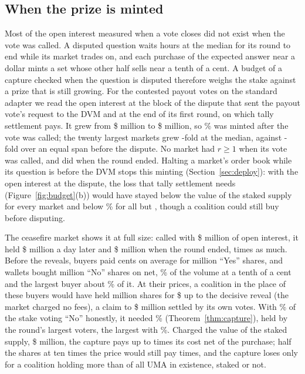 \documentclass[conference,compsoc]{IEEEtran}
\begin{document}
\subsection{When the prize is minted}
\label{sec:prize}
 Most of the open interest measured when a vote closes did not exist when the vote was called. A disputed question waits \prizeVoteHours{} hours at the median for its round to end while its market trades on, and each purchase of the expected answer near a dollar mints a set whose other half sells near a tenth of a cent. A budget of a capture checked when the question is disputed therefore weighs the stake against a prize that is still growing. For the \prizeN{} contested payout votes on the standard adapter we read the open interest at the block of the dispute that sent the payout vote's request to the DVM and at the end of its first round, on which tally settlement pays. It grew from \$\prizeEscM{} million to \$\prizeFirstM{} million, so \prizeAfterPct\% was minted after the vote was called; the twenty largest markets grew \prizeVoteGrowth-fold at the median, against \prizePreGrowth-fold over an equal span before the dispute. No market had $r \ge 1$ when its vote was called, and \prizeDeltaOneFirst{} did when the round ended. Halting a market's order book while its question is before the DVM stops this minting (Section~\ref{sec:deploy}): with the open interest at the dispute, the loss that tally settlement needs (Figure~\ref{fig:budget}(b)) would have stayed below the value of the staked supply for every market and below \deltaDetectablePct\% for all but \prizeReqDetEsc, though a coalition could still buy before disputing.

 The ceasefire market shows it at full size: called with \$\cfOIEscM{} million of open interest, it held \$\cfOIDayM{} million a day later and \$\cfOIEndM{} million when the round ended, \cfGrowth{} times as much. Before the reveals, buyers paid \cfYesCents{} cents on average for \cfYesM{} million ``Yes'' shares, and \cfBuyers{} wallets bought \cfNoM{} million ``No'' shares on net, \cfTickPct\% of the volume at a tenth of a cent and the largest buyer about \cfLargestBuyerPct\% of it. At their prices, a coalition in the place of these buyers would have held \cfNoTotalM{} million shares for \$\cfCostTotal{} up to the decisive reveal (the market charged no fees), a claim to \$\cfNoTotalM{} million settled by its own votes. With \cfHNoPct\% of the stake voting ``No'' honestly, it needed \cfNeedPct\% (Theorem~\ref{thm:capture}), held by the round's \cfCoalitionK{} largest voters, the largest with \cfLargestVoterPct\%. Charged the value of the staked supply, \$\cfStakeM{} million, the capture pays up to \cfOverStake{} times its cost net of the purchase; half the shares at ten times the price would still pay \cfHalfTenX{} times, and the capture loses only for a coalition holding more than \cfOverAllUma{} of all UMA in existence, staked or not.
\end{document}
